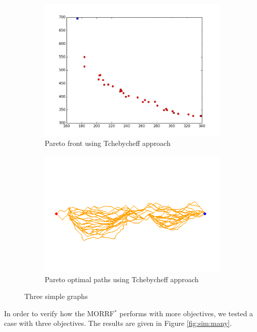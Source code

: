 \documentclass[conference]{IEEEtran}
\begin{document}
\begin{figure}
\begin{subfigure}[b]{0.45\linewidth}
		\includegraphics[width=\textwidth]{fig/sim9-nconvex/PF03-MORRT2.png}
		\caption{Pareto front using Tchebycheff approach}
		\label{fig:sim:nonconvex:pf:b}
	\end{subfigure} 
	\begin{subfigure}[b]{0.45\linewidth}
		\centering
		\includegraphics[width=\textwidth]{fig/sim9-nconvex/MORRTstar03-ALL.png}
		\caption{Pareto optimal paths using Tchebycheff approach}
		\label{fig:sim:nonconvex:sols:b}
	\end{subfigure}
	\caption{Three simple graphs}
	\label{fig:sim:nonconvex}
\end{figure}

In order to verify how the MORRF$^{*}$ performs with more objectives, we tested a case with three objectives.
The results are given in Figure \ref{fig:sim:many}.
\end{document}
